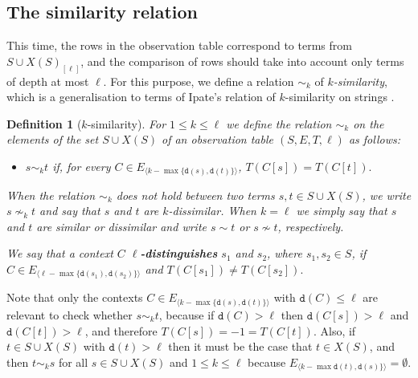 \documentclass[preprint,12pt,english]{article}
\def\depth{\mathtt{d}}
\newcommand\pair[1]{\langle{#1}\rangle}
\newtheorem{definition}{Definition}
\begin{document}
\subsection{The similarity relation}
This time, the rows in the observation table correspond to terms from $S\cup X(S)_{[\ell]}$, and the comparison of rows should take into account only terms of depth at most $\ell$. For this purpose, we define a relation $\sim_k$ of {\em $k$-similarity}, which is a  generalisation to terms of Ipate's relation of $k$-similarity on strings \cite{Ipate:2012}.
\begin{definition}[$k$-similarity] 
For $1\leq k\leq \ell$ we define the relation $\sim_k$ on the elements of  the set $S\cup X(S)$ of an observation table $(S,E,T,\ell)$ as follows:
\begin{itemize}
\item[] $s\sim_k t$ if, for every $C\in E_{\pair{k-\max\{\depth(s),\depth(t)\}}}$, $T(C[s])=T(C[t]).$ 
\end{itemize}
When the relation $\sim_k$ does not hold between two terms $s,t\in S\cup X(S)$, we write $s\nsim_k t$ and say that $s$ and $t$ are {\em $k$-dissimilar}. When $k=\ell$  we simply say that $s$ and $t$ are {\em similar} or {\em dissimilar} and write $s\sim t$ or $s\nsim t$, respectively.

We say that a context $C$ {\bf $\ell$-distinguishes} $s_1$ and $s_2$, where $s_1,s_2\in S$, if $C\in E_{\pair{\ell-\max\{\depth(s_1),\depth(s_2)\}}}$ and $T(C[s_1])\neq T(C[s_2]).$
\end{definition}
Note that only the contexts $C\in E_{\pair{k-\max\{\depth(s),\depth(t)\}}}$ with $\depth(C)\leq \ell$ are relevant to check whether $s\sim_k t$, because if $\depth(C)>\ell$ then $\depth(C[s])>\ell$ and $\depth(C[t])>\ell$, and therefore $T(C[s])=-1=T(C[t]).$ Also, if $t\in S\cup X(S)$ with $\depth(t)>\ell$ then it must be the case that $t\in X(S)$, and then $t\sim_k s$ for all $s\in S\cup X(S)$ and $1\leq k\leq \ell$ because $E_{\pair{k-\max{\depth(t),\depth(s)\}}}}=\emptyset.$
\end{document}
